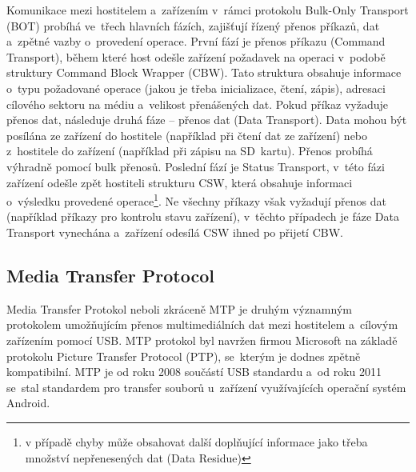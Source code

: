 Komunikace mezi hostitelem a~zařízením v~rámci protokolu Bulk-Only Transport (BOT) probíhá ve~třech hlavních fázích, zajišťují řízený přenos příkazů, dat a~zpětné vazby o~provedení operace. První fází je přenos příkazu (Command Transport), během které host odešle zařízení požadavek na operaci v~podobě struktury Command Block Wrapper (CBW). Tato struktura obsahuje informace o~typu požadované operace (jakou je třeba inicializace, čtení, zápis), adresaci cílového sektoru na médiu a~velikost přenášených dat. Pokud příkaz vyžaduje přenos dat, následuje druhá fáze -- přenos dat (Data Transport). Data mohou být posílána ze zařízení do hostitele (například při čtení dat ze zařízení) nebo z~hostitele do zařízení (například při zápisu na SD~kartu). Přenos probíhá výhradně pomocí bulk přenosů. Poslední fází je Status Transport, v~této fázi zařízení odešle zpět hostiteli strukturu CSW, která obsahuje informaci o~výsledku provedené operace\footnote{v případě chyby může obsahovat další doplňující informace jako třeba množství nepřenesených dat (Data Residue)}. Ne všechny příkazy však vyžadují přenos dat (například příkazy pro kontrolu stavu zařízení), v~těchto případech je fáze Data Transport vynechána a~zařízení odesílá CSW ihned po přijetí CBW.~\cite{silicon_labs_mass_storage_protocol}



\subsection{Media Transfer Protocol}
Media Transfer Protokol neboli zkráceně MTP je druhým významným protokolem umožňujícím přenos multimediálních dat mezi hostitelem a~cílovým zařízením pomocí USB. MTP protokol byl navržen firmou Microsoft na základě protokolu Picture Transfer Protocol (PTP), se~kterým je dodnes zpětně kompatibilní. MTP je od roku 2008 součástí USB standardu a~od roku 2011 se~stal standardem pro transfer souborů u~zařízení využívajících operační systém Android.~\cite{usb_standard_mtp}

